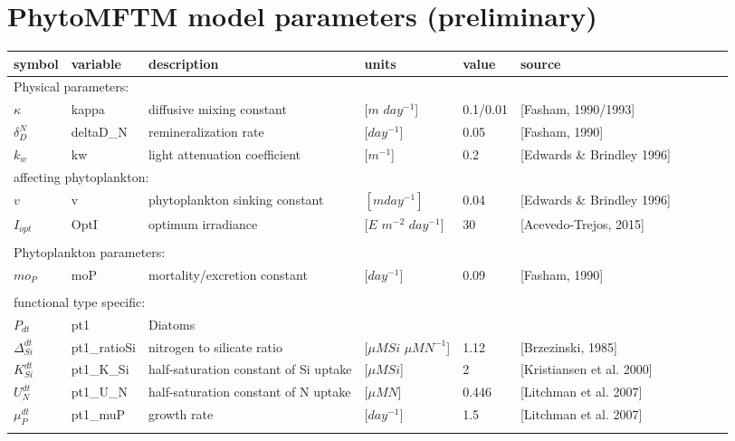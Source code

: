 \documentclass[letterpaper,10pt]{article}
\begin{document}
\thispagestyle{empty}

\section*{PhytoMFTM model parameters (preliminary)}

\noindent
\begin{tabular}{llllllllll}

  symbol               & variable   & description & units   & value      & source\\
  \hline
  \multicolumn{3}{l}{Physical parameters:}\\
  \hline
  $\kappa$ & kappa & diffusive mixing constant & [$m$ $day^{-1}$] & 0.1/0.01 & [Fasham, 1990/1993]\\
  $\delta^{N}_{D}$ & deltaD\_N  & remineralization rate & [$day^{-1}$] & 0.05 & [Fasham, 1990]\\
  $k_w$ & kw & light attenuation coefficient & [$m^{-1}$] & 0.2 & [Edwards \& Brindley 1996]\\                           
  \multicolumn{3}{l}{affecting phytoplankton:} \\
  $v$ & v &  phytoplankton sinking constant & $[m day^{-1}]$ & 0.04 & [Edwards \& Brindley 1996]\\                      
  $I_{opt}$ & OptI & optimum irradiance & [$E$ $m^{-2}$ $day^{-1}$] & 30 & [Acevedo-Trejos, 2015]\\
  \\
  \hline
  \multicolumn{3}{l}{Phytoplankton parameters:}\\
  \hline
  $mo_P$ & moP &  mortality/excretion constant & [$day^{-1}$] & 0.09 & [Fasham, 1990]\\
  \\
  \multicolumn{3}{l}{functional type specific:} \\
  $P_{dt}$ & pt1  & Diatoms\\
  \hline
  $\Delta^{dt}_{Si}$ & pt1\_ratioSi & nitrogen to silicate ratio & [$\mu M Si$ $\mu M N^{-1}$] & 1.12 & [Brzezinski, 1985]  \\
  $K^{dt}_{Si}$ & pt1\_K\_Si & half-saturation constant of Si uptake & [$\mu M Si$] & 2 & [Kristiansen et al. 2000]\\
  $U^{dt}_N$ & pt1\_U\_N & half-saturation constant of N uptake & [$\mu M N$] &  0.446 & [Litchman et al. 2007]\\
  $\mu^{dt}_P$ & pt1\_muP & growth rate & [$day^{-1}$] & 1.5 & [Litchman et al. 2007]\\
  \\

\end{tabular}
\end{document}
